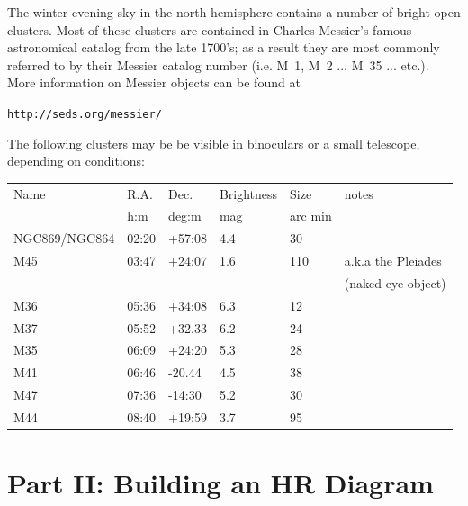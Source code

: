 \documentclass[12pt]{article}
\begin{document}
The winter evening sky in the north hemisphere contains a number of
bright open clusters. Most of these clusters are contained in Charles
Messier's famous astronomical catalog from the late 1700's; as a
result they are most commonly referred to by their Messier catalog
number (i.e. M~1, M~2 ... M~35 ... etc.). More information on Messier
objects can be found at

\vspace{0.5cm}
\centerline{\tt http://seds.org/messier/}
\vspace{0.5cm}

The following clusters may be be visible in binoculars or a small
telescope, depending on conditions:

\begin{center}
\begin{tabular}{llllll}\hline\hline
Name&R.A.&Dec.&Brightness&Size&notes\\
&h:m&deg:m&mag&arc min&\\
NGC869/NGC864& 02:20&+57:08&4.4&30&\\
M45& 03:47&+24:07&1.6&110& a.k.a the Pleiades\\
&&&&&(naked-eye object)\\
M36& 05:36&+34:08&6.3&12&\\
M37& 05:52&+32.33&6.2&24&\\
M35& 06:09&+24:20&5.3&28&\\
M41& 06:46&-20.44&4.5&38&\\
M47& 07:36&-14:30&5.2&30&\\
M44& 08:40&+19:59&3.7&95&\\
\end{tabular}
\end{center}


\section*{Part II: Building an HR Diagram}
\end{document}
